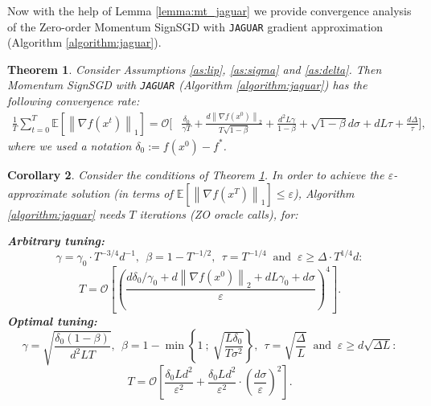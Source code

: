 \documentclass{article}
\theoremstyle{plain}
\newtheorem{theorem}{Theorem}[section]
\newtheorem{corollary}[theorem]{Corollary}
\theoremstyle{definition}
\theoremstyle{remark}
\newcommand{\expect}[1]{\mathbb{E}\left[ #1 \right]}
\newcommand{\norm}[1]{\left\| #1 \right\|}
\begin{document}
Now with the help of Lemma \ref{lemma:mt_jaguar} we provide convergence analysis of the Zero-order Momentum SignSGD with \texttt{JAGUAR} gradient approximation (Algorithm \ref{algorithm:jaguar}).

\begin{theorem}
    \label{theorem:jaguar_sign}
    Consider Assumptions \ref{as:lip}, \ref{as:sigma} and \ref{as:delta}. Then Momentum SignSGD with \texttt{JAGUAR} (Algorithm \ref{algorithm:jaguar}) has the following convergence rate:
        \begin{equation*}
        \begin{split}
            \frac{1}{T} \sum_{t=0}^T \expect{\norm{\nabla f(x^t)}_1}
            =
            \mathcal{O} \Bigg[ 
                &\frac{\delta_0}{\gamma T}
                +
                \frac{d \norm{\nabla f(x^0)}_2}{T \sqrt{1 - \beta}}
                +
                \frac{d^2 L \gamma}{1-\beta}  
                +
                \sqrt{1-\beta}d \sigma
                +
                d L \tau
                +
                \frac{d \Delta}{\tau} 
            \Bigg],
        \end{split}
        \end{equation*}
        where we used a notation $\delta_0 := f(x^0) - f^*$. 
\end{theorem}

\begin{corollary}
    Consider the conditions of Theorem \ref{theorem:jaguar_sign}. In order to achieve the $\varepsilon$-approximate solution (in terms of $\expect{\norm{\nabla f(x^T)}_1} \leq \varepsilon$), Algorithm \ref{algorithm:jaguar} needs $T$ iterations (ZO oracle calls), for:

    \textbf{Arbitrary tuning:}
    $$
        \gamma = \gamma_0 \cdot T^{-3/4} d^{-1}, 
        ~~ \beta = 1 - T^{-1/2},
        ~~ \tau = T^{-1/4}
        ~\text{ and }~
        \varepsilon \geq \Delta \cdot T^{1/4} d:
    $$
    \begin{equation*}
        T = \mathcal{O} \left[ \left( \frac{d \delta_0 / \gamma_0 + d \norm{\nabla f(x^0)}_2 + d L \gamma_0 + d \sigma }{\varepsilon} \right)^4\right] .
    \end{equation*}
    \textbf{Optimal tuning:}
    $$
        \gamma = \sqrt{\frac{\delta_0 (1 - \beta)}{d^2 L T}}, 
        ~~ \beta = 1 - \min\left\{1 ~;~ \sqrt{\frac{L \delta_0}{T \sigma^2}}\right\},
        ~~ \tau = \sqrt{\frac{\Delta}{L}}
        ~\text{ and }~
        \varepsilon \geq d \sqrt{\Delta L}:
    $$
    \begin{equation*}
        T = \mathcal{O} \left[ \frac{\delta_0 L d^2}{\varepsilon^2} + \frac{\delta_0 L d^2}{\varepsilon^2} \cdot \left( \frac{d \sigma}{\varepsilon} \right)^2\right] .
    \end{equation*}
\end{corollary}
\end{document}
